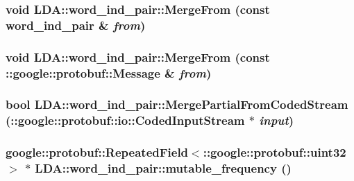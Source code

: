 \label{class_l_d_a_1_1word__ind__pair_a1161972f297fe3164a5fd6dfa9f22cf8}
\hypertarget{class_l_d_a_1_1word__ind__pair_acafb6c56ada84bc671b31ee651ee1ae1}{
\subsubsection[{MergeFrom}]{\setlength{\rightskip}{0pt plus 5cm}void LDA::word\_\-ind\_\-pair::MergeFrom (const {\bf word\_\-ind\_\-pair} \& {\em from})}}
\label{class_l_d_a_1_1word__ind__pair_acafb6c56ada84bc671b31ee651ee1ae1}
\hypertarget{class_l_d_a_1_1word__ind__pair_a096ab8dfabf98d4fc49104d5cc78f30f}{
\subsubsection[{MergeFrom}]{\setlength{\rightskip}{0pt plus 5cm}void LDA::word\_\-ind\_\-pair::MergeFrom (const ::google::protobuf::Message \& {\em from})}}
\label{class_l_d_a_1_1word__ind__pair_a096ab8dfabf98d4fc49104d5cc78f30f}
\hypertarget{class_l_d_a_1_1word__ind__pair_a35555668d4cc7c02b92d63a984234cb9}{
\subsubsection[{MergePartialFromCodedStream}]{\setlength{\rightskip}{0pt plus 5cm}bool LDA::word\_\-ind\_\-pair::MergePartialFromCodedStream (::google::protobuf::io::CodedInputStream $\ast$ {\em input})}}
\label{class_l_d_a_1_1word__ind__pair_a35555668d4cc7c02b92d63a984234cb9}
\hypertarget{class_l_d_a_1_1word__ind__pair_acb159c0917346581889e7a6dbb66a197}{
\subsubsection[{mutable\_\-frequency}]{\setlength{\rightskip}{0pt plus 5cm}google::protobuf::RepeatedField$<$::google::protobuf::uint32 $>$ $\ast$ LDA::word\_\-ind\_\-pair::mutable\_\-frequency ()}}
